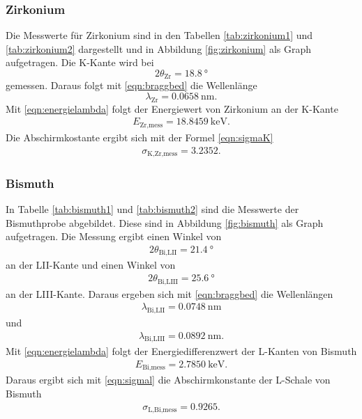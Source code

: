 \subsubsection{Zirkonium}

Die Messwerte für Zirkonium sind in den Tabellen \ref{tab:zirkonium1} und
\ref{tab:zirkonium2} dargestellt und
in Abbildung \ref{fig:zirkonium} als Graph aufgetragen.
Die K-Kante wird bei
\begin{equation}
  2\theta_\text{Zr} = \SI{18.8}{\degree}
\end{equation}
gemessen.
Daraus folgt mit \eqref{eqn:braggbed} die Wellenlänge
\begin{equation}
  \lambda_\text{Zr} = \SI{0.0658}{\nano\meter}.
\end{equation}
Mit \eqref{eqn:energielambda} folgt der Energiewert von Zirkonium an der
K-Kante
\begin{align}
  E_\text{Zr,mess} = \SI{18.8459}{\kilo\electronvolt}.
\end{align}
Die Abschirmkostante ergibt sich mit der Formel \eqref{eqn:sigmaK}
\begin{align}
  \sigma_\text{K,Zr,mess} = 3.2352.
\end{align}

\subsubsection{Bismuth}

In Tabelle \ref{tab:bismuth1} und \ref{tab:bismuth2} sind die Messwerte der
Bismuthprobe abgebildet.
Diese sind in Abbildung \ref{fig:bismuth} als Graph aufgetragen.
Die Messung ergibt einen Winkel von
\begin{align}
  2\theta_\text{Bi,LII} = \SI{21.4}{\degree}
\end{align}
an der LII-Kante und einen Winkel von
\begin{align}
  2\theta_\text{Bi,LIII} = \SI{25.6}{\degree}
\end{align}
an der LIII-Kante.
Daraus ergeben sich mit \eqref{eqn:braggbed} die Wellenlängen
\begin{align}
  \lambda_\text{Bi,LII} = \SI{0.0748}{\nano\meter}
\end{align}
und
\begin{align}
  \lambda_\text{Bi,LIII} = \SI{0.0892}{\nano\meter}.
\end{align}
Mit \eqref{eqn:energielambda} folgt der Energiedifferenzwert der L-Kanten von
Bismuth
\begin{align}
  E_\text{Bi,mess} = \SI{2.7850}{\kilo\electronvolt}.
\end{align}
Daraus ergibt sich mit \eqref{eqn:sigmal} die Abschirmkonstante der L-Schale
von Bismuth
\begin{align}
  \sigma_\text{L,Bi,mess} = 0.9265.
\end{align}

